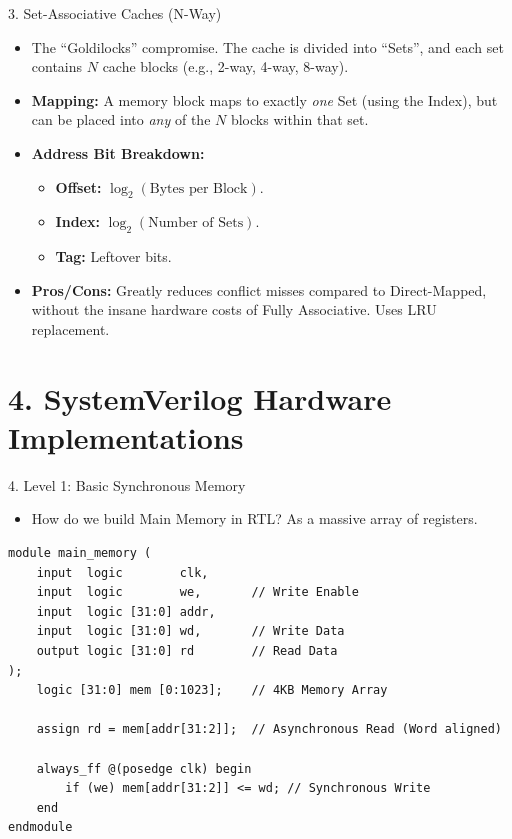 \documentclass[aspectratio=169]{beamer}
\begin{document}
\begin{frame}{3. Set-Associative Caches (N-Way)}
\begin{itemize}
    \item The ``Goldilocks'' compromise. The cache is divided into ``Sets'', and each set contains $N$ cache blocks (e.g., 2-way, 4-way, 8-way).
    \item \textbf{Mapping:} A memory block maps to exactly \textit{one} Set (using the Index), but can be placed into \textit{any} of the $N$ blocks within that set.
    \vspace{0.3cm}
    \item \textbf{Address Bit Breakdown:}
    \begin{itemize}
        \item \textbf{Offset:} $\log_2(\text{Bytes per Block})$.
        \item \textbf{Index:} $\log_2(\text{Number of Sets})$.
        \item \textbf{Tag:} Leftover bits.
    \end{itemize}
    \vspace{0.3cm}
    \item \textbf{Pros/Cons:} Greatly reduces conflict misses compared to Direct-Mapped, without the insane hardware costs of Fully Associative. Uses LRU replacement.
\end{itemize}
\end{frame}

\section{4. SystemVerilog Hardware Implementations}

\begin{frame}[fragile]{4. Level 1: Basic Synchronous Memory}
\begin{itemize}
    \item How do we build Main Memory in RTL? As a massive array of registers.
\end{itemize}
\begin{verbatim}
module main_memory (
    input  logic        clk,
    input  logic        we,       // Write Enable
    input  logic [31:0] addr,
    input  logic [31:0] wd,       // Write Data
    output logic [31:0] rd        // Read Data
);
    logic [31:0] mem [0:1023];    // 4KB Memory Array

    assign rd = mem[addr[31:2]];  // Asynchronous Read (Word aligned)

    always_ff @(posedge clk) begin
        if (we) mem[addr[31:2]] <= wd; // Synchronous Write
    end
endmodule
\end{verbatim}
\end{frame}
\end{document}
